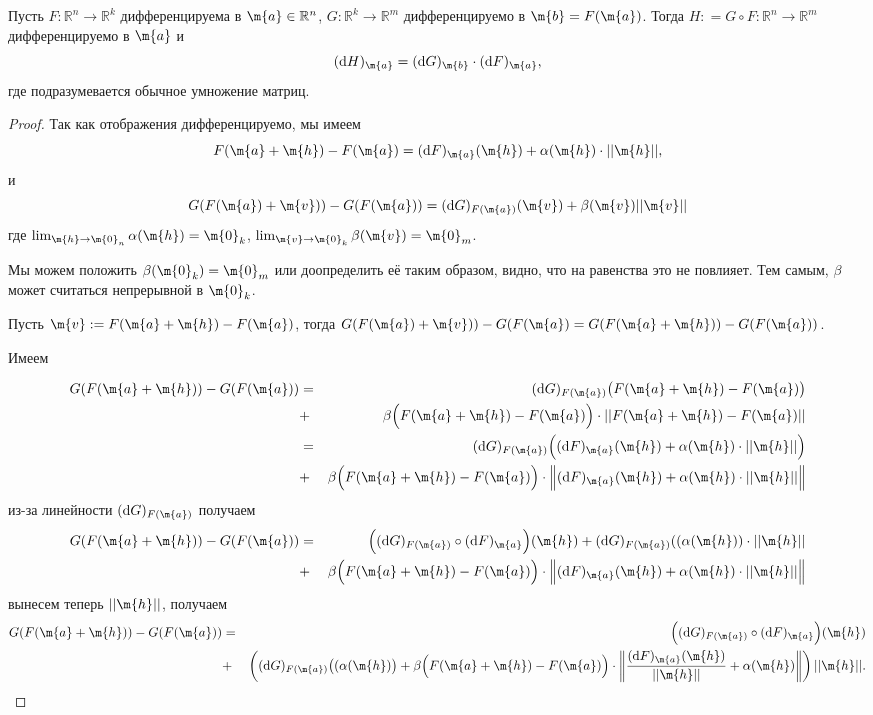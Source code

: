 \begin{theorem}\label{d(FG)}
    Пусть $F: \mathbb{R}^n \to \mathbb{R}^k$ дифференцируема в $\m{a} \in \mathbb{R}^n$, $G: \mathbb{R}^k \to \mathbb{R}^m$ дифференцируемо в $\m{b}= F(\m{a})$. Тогда $H: = G \circ F :\mathbb{R}^n \to \mathbb{R}^m$ дифференцируемо в $\m{a}$ и 
    \[
     (\mathrm{d}H)_\m{a} = (\mathrm{d}G)_{\m{b}} \cdot (\mathrm{d}F)_\m{a},
    \]
    где подразумевается обычное умножение матриц.
\end{theorem}


\begin{proof}

 Так как отображения дифференцируемо, мы имеем
 \[
  F(\m{a} + \m{h}) - F(\m{a}) = (\mathrm{d}F)_\m{a}(\m{h}) + \alpha(\m{h}) \cdot || \m{h}||,
 \] 
 и
 \[
  G(F(\m{a}) + \m{v})) - G(F(\m{a})) = (\mathrm{d}G)_{F(\m{a})}(\m{v}) + \beta(\m{v}) ||\m{v}||
 \]
где $\lim_{\m{h} \to \m{0}_n} \alpha (\m{h}) = \m{0}_k$, $\lim_{\m{v} \to \m{0}_k} \beta (\m{v}) = \m{0}_m$.

Мы можем положить $\beta(\m{0}_k) = \m{0}_m$ или доопределить её таким образом, видно, что на равенства это не повлияет. Тем самым, $\beta$ может считаться непрерывной в $\m{0}_k$.

Пусть $\m{v}: = F(\m{a} + \m{h}) - F(\m{a})$, тогда $G(F(\m{a}) + \m{v})) - G(F(\m{a}) = G(F(\m{a}+\m{h})) -G(F(\m{a}))$. 

Имеем

\begin{eqnarray*}
    G(F(\m{a}+\m{h})) -G(F(\m{a})) &=& (\mathrm{d}G)_{F(\m{a})}\bigl(F(\m{a}+ \m{h}) - F(\m{a})\bigr)  \\
    &+& \beta\Bigl( F(\m{a} +\m{h}) - F(\m{a}) \Bigr) \cdot || F(\m{a} + \m{h}) - F(\m{a})|| \\
    &=& (\mathrm{d}G)_{F(\m{a})} \Bigl( (\mathrm{d}F)_\m{a}(\m{h}) + \alpha(\m{h}) \cdot || \m{h}||\Bigr) \\
    &+& \beta \Bigl(F(\m{a} + \m{h}) - F(\m{a})\Bigr) \cdot \Bigl\| (\mathrm{d}F)_\m{a}(\m{h}) + \alpha(\m{h}) \cdot || \m{h}|| \Bigr\|
\end{eqnarray*}
из-за линейности $(\mathrm{d}G)_{F(\m{a})}$ получаем
\begin{eqnarray*}
    G(F(\m{a}+\m{h})) -G(F(\m{a})) &=&\Bigl((\mathrm{d}G)_{F(\m{a})} \circ (\mathrm{d}F)_\m{a}\Bigr) (\m{h}) + (\mathrm{d}G)_{F(\m{a})}((\alpha(\m{h})) \cdot || \m{h}|| \\
    &+& \beta \Bigl(F(\m{a} + \m{h}) - F(\m{a}) \Bigr) \cdot \Bigl\| (\mathrm{d}F)_\m{a}(\m{h}) + \alpha(\m{h}) \cdot || \m{h}|| \Bigr\|     
\end{eqnarray*}
вынесем теперь $|| \m{h}||$, получаем
\begin{eqnarray*}
    G(F(\m{a}+\m{h})) -G(F(\m{a})) &=&\Bigl((\mathrm{d}G)_{F(\m{a})} \circ (\mathrm{d}F)_\m{a}\Bigr) (\m{h})\\
    &+&\left( (\mathrm{d}G)_{F(\m{a})}\bigl((\alpha(\m{h})\bigr) + \beta \Bigl(F(\m{a} + \m{h}) - F(\m{a}) \Bigr) \cdot \left\| \frac{(\mathrm{d}F)_\m{a}(\m{h})}{|| \m{h} ||} + \alpha(\m{h})  \right\| \right) || \m{h} ||.     
\end{eqnarray*}


\end{proof}
